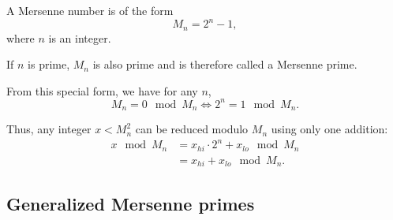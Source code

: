 \documentclass[a4paper]{article}
\begin{document}
\begin{definition}
    A Mersenne number is of the form $$ M_n = 2^n-1,$$ where $n$ is an integer.

    If $n$ is prime, $M_n$ is also prime and is therefore called a Mersenne prime.
\end{definition}

From this special form, we have for any $n$,
\[
M_n = 0 \mod M_n \Longleftrightarrow 2^n = 1 \mod M_n.
\]

Thus, any integer $x < M_n^2$ can be reduced modulo $M_n$ using only one addition: 
\begin{align*}
x \mod M_n &= x_{hi}\cdot 2^{n} + x_{lo} \mod M_n \\
    &= x_{hi} + x_{lo} \mod M_n.
\end{align*}


\subsection{Generalized Mersenne primes}


\newpage
 
 
\nocite{*}
\end{document}

